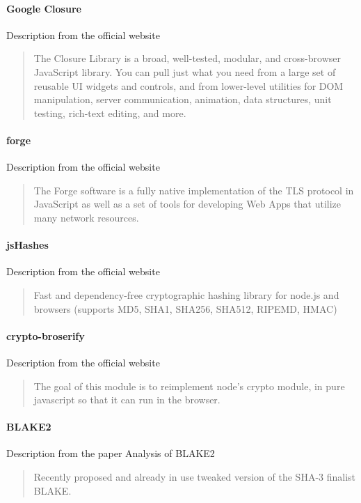\paragraph{Google Closure}
Description from the official website \cite{Google2015ClosureLibrary}
\blockquote{The Closure Library is a broad, well-tested, modular, and cross-browser JavaScript library. You can pull just what you need from a large set of reusable UI widgets and controls, and from lower-level utilities for DOM manipulation, server communication, animation, data structures, unit testing, rich-text editing, and more.}

\paragraph{forge}
Description from the official website \cite{DigitalBazaar2016Forge}
\blockquote{The Forge software is a fully native implementation of the TLS protocol in JavaScript as well as a set of tools for developing Web Apps that utilize many network resources.}

\paragraph{jsHashes}
Description from the official website \cite{Johnston2015JsHashes}
\blockquote{Fast and dependency-free cryptographic hashing library for node.js and browsers (supports MD5, SHA1, SHA256, SHA512, RIPEMD, HMAC)}

\paragraph{crypto-broserify}
Description from the official website \cite{Tarr2013Crypto-Browserify}
\blockquote{The goal of this module is to reimplement node's crypto module, in pure javascript so that it can run in the browser.}

\paragraph{BLAKE2\cite{SaarinenM-J.2015TheMAC}}
Description from the paper Analysis of BLAKE2 \cite{Guo2014AnalysisBLAKE2}
\blockquote{Recently proposed and already in use tweaked version of the SHA-3 finalist BLAKE.}

